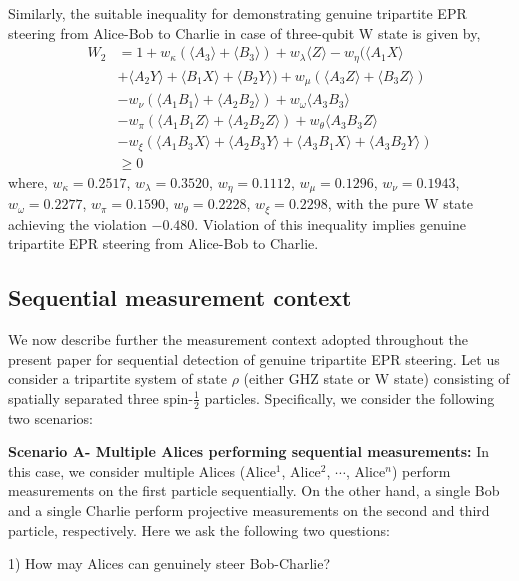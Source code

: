\documentclass[pra,a4paper,aps,twocolumn,showpacs,superscriptaddress,groupedaddress]{revtex4}
\begin{document}
Similarly, the suitable inequality for demonstrating genuine tripartite EPR steering from Alice-Bob to Charlie in case of three-qubit W state is given by,
\begin{align}
W_2 &= 1 + w_{\kappa}(\langle A_3 \rangle + \langle B_3 \rangle) + w_{\lambda} \langle Z\rangle - w_{\eta}( \langle A_1 X \rangle \nonumber \\
&+ \langle A_2 Y \rangle + \langle B_1 X  \rangle + \langle B_2 Y  \rangle ) + w_{\mu} ( \langle A_3 Z \rangle + \langle B_3 Z \rangle) \nonumber \\
& - w_{\nu} ( \langle A_1B_1\rangle + \langle A_2B_2 \rangle ) + w_{\omega}  \langle A_3B_3\rangle \nonumber \\
& - w_{\pi}( \langle A_1B_1Z\rangle + \langle A_2B_2Z\rangle ) + w_{\theta} \langle A_3B_3Z\rangle  \nonumber \\ 
& -w_{\xi} (\langle A_1B_3X\rangle + \langle A_2B_3Y\rangle + \langle A_3B_1X\rangle + \langle A_3B_2 Y\rangle ) \nonumber \\
& \geq 0
\label{W2}
\end{align}
where, $w_{\kappa}=0.2517$, $w_{\lambda}=0.3520$, $w_{\eta}=0.1112$, $w_{\mu}=0.1296$,
$w_{\nu}=0.1943$, $w_{\omega}=0.2277$, $w_{\pi}=0.1590$, $w_{\theta}=0.2228$, $w_{\xi}=0.2298$,
with the pure W state achieving the violation $-0.480$.  Violation of this inequality implies genuine tripartite EPR steering from Alice-Bob to Charlie.



\subsection{Sequential measurement context} \label{scenario}
We now describe further the measurement context adopted throughout the present paper for sequential detection of genuine tripartite EPR steering. Let us consider  a tripartite system of state $\rho$ (either GHZ state or W state) consisting of spatially separated three spin-$\frac{1}{2}$ particles.  Specifically, we consider the following two scenarios:

{\bf Scenario A- Multiple Alices performing sequential measurements:} In this case, we consider multiple Alices (Alice$^1$, Alice$^2$, $\cdots$, Alice$^n$) perform measurements on the first particle sequentially. On the other hand, a single Bob and a single Charlie  perform projective measurements on the second and third particle, respectively. Here we ask the following two questions:

1) How may Alices can genuinely steer Bob-Charlie?
\end{document}
